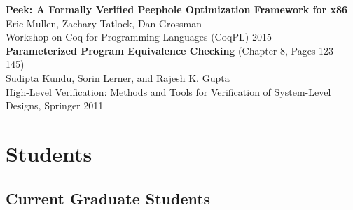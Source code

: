 \documentclass[10pt]{article}
\begin{document}
\textbf{%
Peek: A Formally Verified Peephole Optimization Framework for x86
} \\
Eric Mullen, Zachary Tatlock, Dan Grossman \\
Workshop on Coq for Programming Languages (CoqPL) 2015 \\

\textbf{%
Parameterized Program Equivalence Checking
} (Chapter 8, Pages 123 - 145) \\
Sudipta Kundu, Sorin Lerner, and Rajesh K. Gupta \\
High-Level Verification: Methods and Tools for Verification of System-Level Designs, Springer 2011


\section*{Students}

\subsection*{Current Graduate Students}
\end{document}
